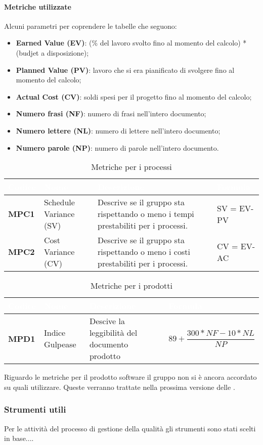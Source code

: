 \paragraph{Metriche utilizzate}
Alcuni parametri per coprendere le tabelle che seguono:
\begin{itemize}
	\item \textbf{Earned Value (EV)}: (\% del lavoro svolto fino al momento del calcolo) * (budjet a disposizione);
	\item \textbf{Planned Value (PV)}: lavoro che si era pianificato di svolgere fino al momento del calcolo;
	\item \textbf{Actual Cost (CV)}: soldi spesi per il progetto fino al momento del calcolo;
	\item \textbf{Numero frasi (NF)}: numero di frasi nell'intero documento;
	\item \textbf{Numero lettere (NL)}: numero di lettere nell'intero documento;
	\item \textbf{Numero parole (NP)}: numero di parole nell'intero documento.
\end{itemize}

\renewcommand{\arraystretch}{1.5}
\renewcommand\extrarowheight{1.5pt}
\begin{longtable}{C{1.5cm} | C{4.5cm} C{5.5cm} C{4.5cm}}
		\caption{Metriche per i processi} \\
		\textcolor{white}{\textbf{Codice}} & 
		\textcolor{white}{\textbf{Nome}} & 
		\textcolor{white}{\textbf{Descrizione}} & 
		\textcolor{white}{\textbf{Formula}} \\
		\endfirsthead
		\hline
		\textbf{MPC1} & 
		Schedule Variance (SV)  & 
		Descrive se il gruppo sta rispettando o meno i tempi prestabiliti per i processi. & 
		SV = EV-PV \\
		\textbf{MPC2} & 
		Cost Variance (CV) & 
		Descrive se il gruppo sta rispettando o meno i costi prestabiliti per i processi. & 
		CV = EV-AC \\
\end{longtable}

\renewcommand{\arraystretch}{1.5}
\renewcommand\extrarowheight{1.5pt}
\begin{longtable}{C{1.5cm} | C{4.5cm} C{5.5cm} C{4.5cm}}
		\caption{Metriche per i prodotti} \\
		\textcolor{white}{\textbf{Codice}} & 
		\textcolor{white}{\textbf{Nome}} & 
		\textcolor{white}{\textbf{Descrizione}} & 
		\textcolor{white}{\textbf{Formula}} \\
		\endfirsthead
		\hline
		\textbf{MPD1} & 
		Indice Gulpease & 
		Descive la leggibilità del documento prodotto & 
		\[ 89 + \frac{300*NF - 10*NL}{NP}\] \\
\end{longtable}
Riguardo le metriche per il prodotto software il gruppo non si è ancora accordato su quali utilizzare. Queste verranno trattate nella prossima versione delle \NdPv{}.    

\subsubsection{Strumenti utili}
Per le attività del processo di gestione della qualità gli strumenti sono stati scelti in base.... 

 

  

